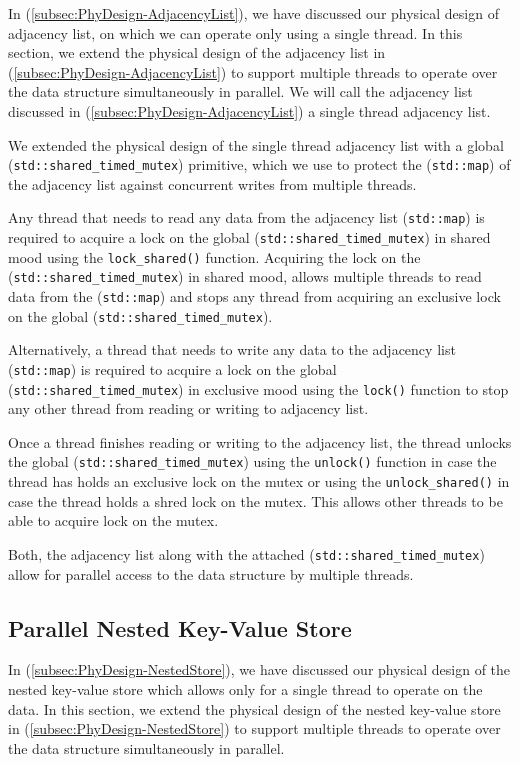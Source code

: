 {In (\ref{subsec:PhyDesign-AdjacencyList}), we have discussed our physical design of adjacency list, on which we can operate only using a single thread. In this section, we extend the physical design of the adjacency list in (\ref{subsec:PhyDesign-AdjacencyList}) to support multiple threads to operate over the data structure simultaneously in parallel. We will call the adjacency list discussed in (\ref{subsec:PhyDesign-AdjacencyList}) a single thread adjacency list.

We extended the physical design of the single thread adjacency list with a global (\texttt{std::shared\_timed\_mutex}) primitive, which we use to protect the (\texttt{std::map}) of the adjacency list against concurrent writes from multiple threads.

Any thread that needs to read any data from the adjacency list (\texttt{std::map}) is required to acquire a lock on the global (\texttt{std::shared\_timed\_mutex}) in shared mood using the \texttt{lock\_shared()} function. Acquiring the lock on the (\texttt{std::shared\_timed\_mutex}) in shared mood, allows multiple threads to read data from the (\texttt{std::map}) and stops any thread from acquiring an exclusive lock on the global (\texttt{std::shared\_timed\_mutex}). 

Alternatively, a thread that needs to write any data to the adjacency list (\texttt{std::map}) is required to acquire a lock on the global (\texttt{std::shared\_timed\_mutex}) in exclusive mood using the \texttt{lock()} function to stop any other thread from reading or writing to adjacency list. 

Once a thread finishes reading or writing to the adjacency list, the thread unlocks the global (\texttt{std::shared\_timed\_mutex}) using the  \texttt{unlock()} function in case the thread has holds an exclusive lock on the mutex or using the  \texttt{unlock\_shared()} in case the thread holds a shred lock on the mutex. This allows other threads to be able to acquire lock on the mutex.

Both, the adjacency list along with the attached (\texttt{std::shared\_timed\_mutex}) allow for parallel access to the data structure by multiple threads.


\subsection{Parallel Nested Key-Value Store}
\label{subsec:PhyDesign-ParallelNestedStore}

In (\ref{subsec:PhyDesign-NestedStore}), we have discussed our physical design of the nested key-value store which allows only for a single thread to operate on the data. In this section, we extend the physical design of the nested key-value store in (\ref{subsec:PhyDesign-NestedStore}) to support multiple threads to operate over the data structure simultaneously in parallel.

}
